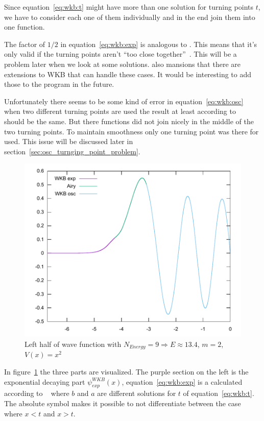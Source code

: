 \documentclass[11pt,DIV=10,final]{scrreprt} %
\begin{document}
Since equation~\ref{eq:wkb:t} might have more than one solution for turning points $t$, we have to consider each one of them individually and in the end join them into one function.

The factor of $1/2$ in equation~\ref{eq:wkb:exp} is analogous to \citep[eq. 92]{robert2020wkb}. This means that it's only valid if the turning points aren't ``too close together''~\citep{robert2020wkb}.
This will be a problem later when we look at some solutions. \cite{robert2020wkb} also mansions that there are extensions to WKB that can handle these cases. It would be interesting to add those to the
program in the future.

Unfortunately there seems to be some kind of error in equation~\ref{eq:wkb:osc} when two different turning points are used the result at least according to~\cite{hall2013quantum} should be the same.
But there functions did not join nicely in the middle of the two turning points. To maintain smoothness only one turning point was there for used. This issue will be discussed later in
section~\ref{sec:osc_turnging_point_problem}.

\begin{figure}[H]
  \centering
  \includegraphics[width=.9\textwidth]{plots/square9half.pdf}
  \caption{Left half of wave function with $N_{Energy} = 9 \Rightarrow E \approx 13.4$, $m = 2$, $V(x) = x^{2}$}\label{fig:wave_parts}
\end{figure}
In figure~\ref{fig:wave_parts} the three parts are visualized. The purple section on the left is the exponential decaying part $\psi^{WKB}_{exp} (x)$, equation~\ref{eq:wkb:exp} is a calculated according to
~\cite[p. 317, Claim 15.7]{hall2013quantum} where $b$ and $a$ are different solutions for $t$ of equation~\ref{eq:wkb:t}. The absolute symbol makes it possible to not
differentiate between the case where $x < t$ and $x > t$.
\end{document}

